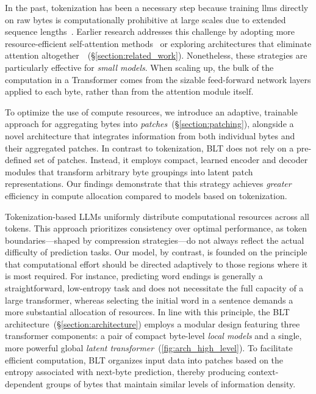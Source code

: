 In the past, tokenization has been a necessary step because training llms directly on raw bytes is computationally prohibitive at large scales due to extended sequence lengths~\citep{xue2022byt5}. Earlier research addresses this challenge by adopting more resource-efficient self-attention methods~\citep{el2020characterbert, clark2022canine} or exploring architectures that eliminate attention altogether~\citep{wang2024mambabyte}~(\S\ref{section:related_work}). Nonetheless, these strategies are particularly effective for \textit{small models}. When scaling up, the bulk of the computation in a Transformer comes from the sizable feed-forward network layers applied to each byte, rather than from the attention module itself.

To optimize the use of compute resources, we introduce an adaptive, trainable approach for aggregating bytes into \textit{patches}~(\S\ref{section:patching}), alongside a novel architecture that integrates information from both individual bytes and their aggregated patches. In contrast to tokenization, {\textsc BLT} does not rely on a pre-defined set of patches. Instead, it employs compact, learned encoder and decoder modules that transform arbitrary byte groupings into latent patch representations. Our findings demonstrate that this strategy achieves \textit{greater} efficiency in compute allocation compared to models based on tokenization.

Tokenization-based LLMs uniformly distribute computational resources across all tokens. This approach prioritizes consistency over optimal performance, as token boundaries—shaped by compression strategies—do not always reflect the actual difficulty of prediction tasks. Our model, by contrast, is founded on the principle that computational effort should be directed adaptively to those regions where it is most required. For instance, predicting word endings is generally a straightforward, low-entropy task and does not necessitate the full capacity of a large transformer, whereas selecting the initial word in a sentence demands a more substantial allocation of resources. In line with this principle, the {\textsc BLT} architecture~(\S\ref{section:architecture}) employs a modular design featuring three transformer components: a pair of compact byte-level \textit{local models} and a single, more powerful global \textit{latent transformer}~(\autoref{fig:arch_high_level}).
To facilitate efficient computation, {\textsc BLT} organizes input data into patches based on the entropy associated with next-byte prediction, thereby producing context-dependent groups of bytes that maintain similar levels of information density.

